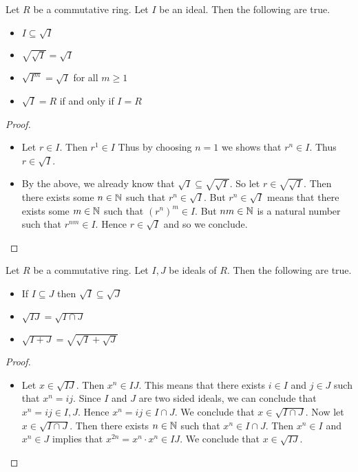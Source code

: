 \documentclass[a4paper]{article}
\begin{document}
\begin{prp}{}{} Let $R$ be a commutative ring. Let $I$ be an ideal. Then the following are true. 
\begin{itemize}
\item $I\subseteq\sqrt{I}$
\item $\sqrt{\sqrt{I}}=\sqrt{I}$
\item $\sqrt{I^m}=\sqrt{I}$ for all $m\geq 1$
\item $\sqrt{I}=R$ if and only if $I=R$
\end{itemize} \tcbline
\begin{proof}~\\
\begin{itemize}
\item Let $r\in I$. Then $r^1\in I$ Thus by choosing $n=1$ we shows that $r^n\in I$. Thus $r\in\sqrt{I}$. 
\item By the above, we already know that $\sqrt{I}\subseteq\sqrt{\sqrt{I}}$. So let $r\in\sqrt{\sqrt{I}}$. Then there exists some $n\in\mathbb{N}$ such that $r^n\in\sqrt{I}$. But $r^n\in\sqrt{I}$ means that there exists some $m\in\mathbb{N}$ such that $(r^n)^m\in I$. But $nm\in\mathbb{N}$ is a natural number such that $r^{nm}\in I$. Hence $r\in\sqrt{I}$ and so we conclude. 
\end{itemize}
\end{proof}
\end{prp}

\begin{prp}{}{} Let $R$ be a commutative ring. Let $I,J$ be ideals of $R$. Then the following are true. 
\begin{itemize}
\item If $I\subseteq J$ then $\sqrt{I}\subseteq\sqrt{J}$
\item $\sqrt{IJ}=\sqrt{I\cap J}$
\item $\sqrt{I+J}=\sqrt{\sqrt{I}+\sqrt{J}}$
\end{itemize} \tcbline
\begin{proof}~\\
\begin{itemize}
\item Let $x\in\sqrt{IJ}$. Then $x^n\in IJ$. This means that there exists $i\in I$ and $j\in J$ such that $x^n=ij$. Since $I$ and $J$ are two sided ideals, we can conclude that $x^n=ij\in I,J$. Hence $x^n=ij\in I\cap J$. We conclude that $x\in\sqrt{I\cap J}$. Now let $x\in\sqrt{I\cap J}$. Then there exists $n\in\mathbb{N}$ such that $x^n\in I\cap J$. Then $x^n\in I$ and $x^n\in J$ implies that $x^{2n}=x^n\cdot x^n\in IJ$. We conclude that $x\in\sqrt{IJ}$. 
\end{itemize}
\end{proof}
\end{prp}
\end{document}
